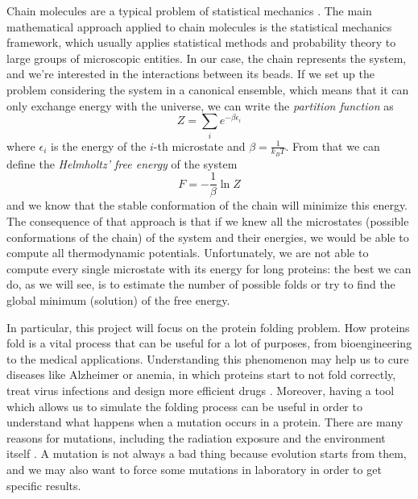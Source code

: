 Chain molecules are a typical problem of statistical mechanics \cite{statisticalmechanics}.
The main mathematical approach applied to chain molecules is the statistical mechanics framework, which usually applies statistical methods and probability theory to large groups of microscopic entities.
In our case, the chain represents the system, and we're interested in the interactions between its beads.
If we set up the problem considering the system in a canonical ensemble, which means that it can only exchange energy with the universe, we can write the \emph{partition function} as
\begin{equation*}
    Z = \sum_i e^{-\beta\epsilon_i}
\end{equation*}
where $\epsilon_i$ is the energy of the $i$-th microstate and $\beta = \frac{1}{k_BT}$.
From that we can define the \emph{Helmholtz' free energy} of the system
\begin{equation*}
    F = -\frac{1}{\beta} \ln Z
\end{equation*}
and we know that the stable conformation of the chain will minimize this energy.
The consequence of that approach is that if we knew all the microstates (possible conformations of the chain) of the system and their energies, we would be able to compute all thermodynamic potentials.
Unfortunately, we are not able to compute every single microstate with its energy for long proteins: the best we can do, as we will see, is to estimate the number of possible folds or try to find the global minimum (solution) of the free energy.

In particular, this project will focus on the protein folding problem.
How proteins fold is a vital process that can be useful for a lot of purposes, from bioengineering to the medical applications.
Understanding this phenomenon may help us to cure diseases like Alzheimer or anemia, in which proteins start to not fold correctly, treat virus infections and design more efficient drugs \cite{PERM}. 
Moreover, having a tool which allows us to simulate the folding process can be useful in order to understand what happens when a mutation occurs in a protein.
There are many reasons for mutations, including the radiation exposure and the environment itself \cite{zanichelli}.
A mutation is not always a bad thing because evolution starts from them, and we may also want to force some mutations in laboratory in order to get specific results.

